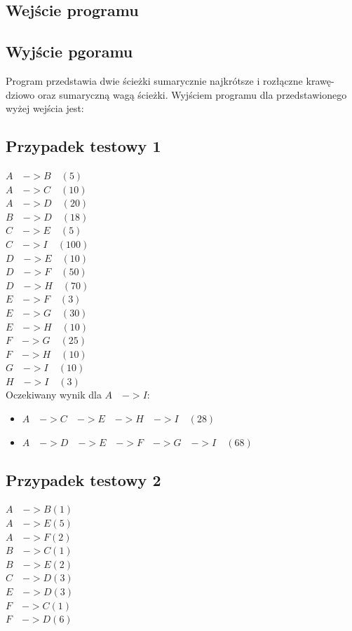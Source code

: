 \documentclass[10pt,a4paper]{article}
\begin{document}
\subsection{Wejście programu}


\subsection{Wyjście pgoramu}
Program przedstawia dwie ścieżki sumarycznie najkrótsze i rozłączne krawę-
dziowo oraz sumaryczną wagą ścieżki. Wyjściem programu dla przedstawionego wyżej wejścia jest: \\
\subsection{Przypadek testowy 1}
$A \quad-> B\quad (5)$ \\
$A \quad-> C \quad(10)$ \\
$A \quad-> D\quad (20)$ \\
$B \quad-> D \quad(18)$\\
$C \quad-> E\quad (5)$\\
$C \quad-> I\quad (100)$\\
$D \quad-> E\quad (10)$\\
$D \quad-> F \quad(50)$\\
$D\quad -> H \quad(70)$\\
$E \quad-> F \quad(3)$\\
$E \quad-> G \quad(30)$\\
$E \quad-> H\quad (10)$\\
$F\quad -> G\quad (25)$\\
$F\quad -> H \quad(10)$\\
$G\quad -> I\quad (10)$\\
$H \quad-> I\quad (3)$\\

Oczekiwany wynik dla $ A\quad -> I:$
\begin{itemize}
	\item $A \quad-> C \quad-> E \quad-> H \quad-> I \quad(28)$
	\item  $A \quad-> D \quad-> E\quad -> F \quad-> G \quad-> I \quad(68)$
\end{itemize}

\subsection{Przypadek testowy 2}
$A\quad -> B (1)$\\
$A \quad-> E (5)$\\
$A \quad-> F (2)$\\
$B \quad-> C (1)$\\
$B\quad -> E (2)$\\
$C \quad-> D (3)$\\
$E \quad-> D (3)$\\
$F \quad-> C (1)$\\
$F\quad -> D (6)$\\
\end{document}

